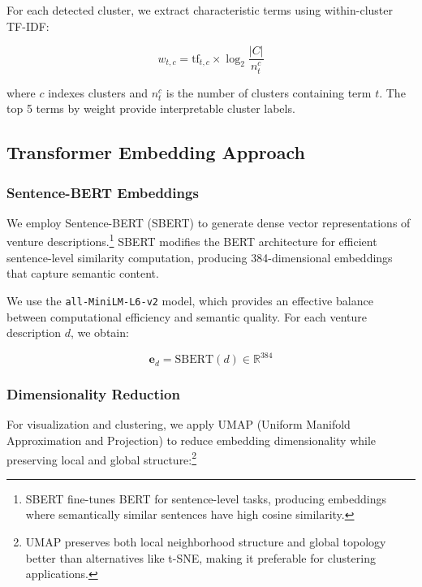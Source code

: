 \documentclass[../main.tex]{subfiles}
\begin{document}
For each detected cluster, we extract characteristic terms using within-cluster TF-IDF:

\begin{equation}
    w_{t,c} = \text{tf}_{t,c} \times \log_2 \frac{|C|}{n_t^c}
\end{equation}

where $c$ indexes clusters and $n_t^c$ is the number of clusters containing term $t$. The top 5 terms by weight provide interpretable cluster labels.

\subsection{Transformer Embedding Approach}

\subsubsection{Sentence-BERT Embeddings}

We employ Sentence-BERT (SBERT) \cite{reimers2019sentence} to generate dense vector representations of venture descriptions.\footnote{SBERT fine-tunes BERT for sentence-level tasks, producing embeddings where semantically similar sentences have high cosine similarity.} SBERT modifies the BERT architecture \cite{devlin2019bert} for efficient sentence-level similarity computation, producing 384-dimensional embeddings that capture semantic content.

We use the \texttt{all-MiniLM-L6-v2} model, which provides an effective balance between computational efficiency and semantic quality. For each venture description $d$, we obtain:

\begin{equation}
    \mathbf{e}_d = \text{SBERT}(d) \in \mathbb{R}^{384}
\end{equation}

\subsubsection{Dimensionality Reduction}

For visualization and clustering, we apply UMAP (Uniform Manifold Approximation and Projection) \cite{mcinnes2018umap} to reduce embedding dimensionality while preserving local and global structure:\footnote{UMAP preserves both local neighborhood structure and global topology better than alternatives like t-SNE, making it preferable for clustering applications.}
\end{document}
